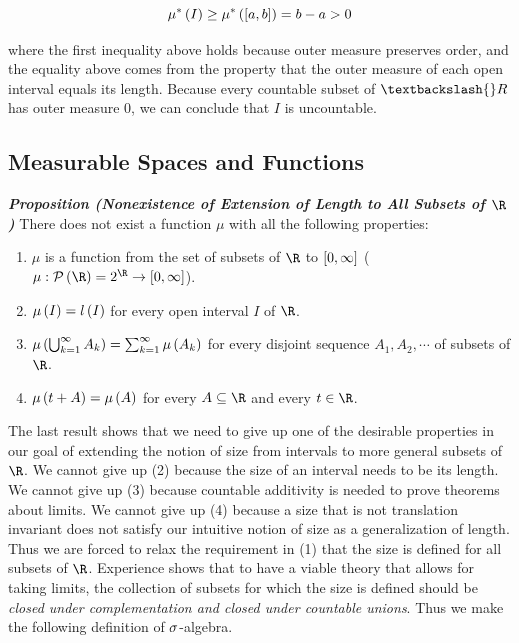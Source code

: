 \documentclass[
]{article}
\newenvironment{Shaded}{}{}
\newcommand{\NormalTok}[1]{#1}
\begin{document}
\[\mu^*\left(I\right)\ge \mu^*\left(\left[a,b\right]\right) = b-a> 0\]

\begin{Shaded}
\begin{Highlighting}[]
\NormalTok{where the first inequality above holds because outer measure preserves order, and the equality above comes from the property that the outer measure of each open interval equals its length. Because every countable subset of $\textbackslash{}R$ has outer measure $0$, we can conclude that $I$ is uncountable.}
\end{Highlighting}
\end{Shaded}

\hypertarget{measurable-spaces-and-functions}{%
\subsection{Measurable Spaces and
Functions}\label{measurable-spaces-and-functions}}

\emph{\textbf{Proposition (Nonexistence of Extension of Length to All
Subsets of \(\R\))}} There does not exist a function \(\mu\) with all
the following properties:

\begin{enumerate}
\def\labelenumi{\arabic{enumi}.}
\item
  \(\mu\) is a function from the set of subsets of \(\R\) to
  \(\left[0,\infty\right]\) (\(\mu:\P\pr{\R} = 2^{\R}\to \br{0,\infty}\)).
\item
  \(\mu\left(I\right) = l\left(I\right)\) for every open interval \(I\) of \(\R\).
\item
  \(\mu\left(\bigcup_{k = 1}^{\infty}A_k\right) = \sum_{k = 1}^{\infty}\mu\left(A_k\right)\)
  for every disjoint sequence \(A_1,A_2,\cdots\) of subsets of \(\R\).
\item
  \(\mu\left(t+A\right) = \mu\left(A\right)\) for every \(A\subseteq \R\) and every
  \(t\in \R\).
\end{enumerate}

The last result shows that we need to give up one of the desirable
properties in our goal of extending the notion of size from intervals to
more general subsets of \(\R\). We cannot give up (2) because the size
of an interval needs to be its length. We cannot give up (3) because
countable additivity is needed to prove theorems about limits. We cannot
give up (4) because a size that is not translation invariant does not
satisfy our intuitive notion of size as a generalization of length.\\
Thus we are forced to relax the requirement in (1) that the size is
defined for all subsets of \(\R\). Experience shows that to have a
viable theory that allows for taking limits, the collection of subsets
for which the size is defined should be \emph{closed under
complementation and closed under countable unions}. Thus we make the
following definition of \(\sigma\)-algebra.
\end{document}
